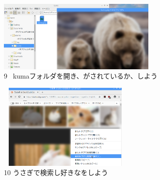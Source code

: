\documentclass[a4paper,12pt]{jarticle}
\begin{document}
\begin{figure}[t]
  \begin{minipage}{\textwidth}
    \begin{minipage}{7.882cm}
      \includegraphics[width=7.872cm,height=3.54cm]{textbook-img102.png}\\
      9 \ kumaフォルダを開き、がされているか、しよう
    \end{minipage}
    \begin{minipage}{2.582cm}
    \end{minipage}
    \begin{minipage}{6.582cm}
      \includegraphics[width=6.71cm,height=4.228cm]{textbook-img101.png}\\
      10 うさぎで検索し好きなをしよう
    \end{minipage}
  \end{minipage}

  \vspace{60mm}

\end{figure}



\bigskip



\clearpage
\end{document}
